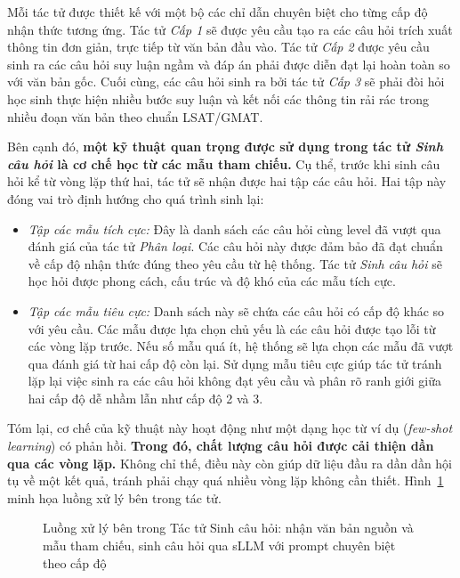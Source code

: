 Mỗi tác tử được thiết kế với một bộ các chỉ dẫn chuyên biệt cho từng cấp độ nhận thức tương ứng. Tác tử \textit{Cấp 1} sẽ được yêu cầu tạo ra các câu hỏi trích xuất thông tin đơn giản, trực tiếp từ văn bản đầu vào. Tác tử \textit{Cấp 2} được yêu cầu sinh ra các câu hỏi suy luận ngầm và đáp án phải được diễn đạt lại hoàn toàn so với văn bản gốc. Cuối cùng, các câu hỏi sinh ra bởi tác tử \textit{Cấp 3} sẽ phải đòi hỏi học sinh thực hiện nhiều bước suy luận và kết nối các thông tin rải rác trong nhiều đoạn văn bản theo chuẩn LSAT/GMAT.

Bên cạnh đó, \textbf{một kỹ thuật quan trọng được sử dụng trong tác tử \textit{Sinh câu hỏi} là cơ chế học từ các mẫu tham chiếu.} Cụ thể, trước khi sinh câu hỏi kể từ vòng lặp thứ hai, tác tử sẽ nhận được hai tập các câu hỏi. Hai tập này đóng vai trò định hướng cho quá trình sinh lại:
\begin{itemize}
    \item \textit{Tập các mẫu tích cực:} Đây là danh sách các câu hỏi cùng level đã vượt qua đánh giá của tác tử \textit{Phân loại}. Các câu hỏi này được đảm bảo đã đạt chuẩn về cấp độ nhận thức đúng theo yêu cầu từ hệ thống. Tác tử \textit{Sinh câu hỏi} sẽ học hỏi được phong cách, cấu trúc và độ khó của các mẫu tích cực.

    \item \textit{Tập các mẫu tiêu cực:} Danh sách này sẽ chứa các câu hỏi có cấp độ khác so với yêu cầu. Các mẫu được lựa chọn chủ yếu là các câu hỏi được tạo lỗi từ các vòng lặp trước. Nếu số mẫu quá ít, hệ thống sẽ lựa chọn các mẫu đã vượt qua đánh giá từ hai cấp độ còn lại. Sử dụng mẫu tiêu cực giúp tác tử tránh lặp lại việc sinh ra các câu hỏi không đạt yêu cầu và phân rõ ranh giới giữa hai cấp độ dễ nhầm lẫn như cấp độ 2 và 3.
\end{itemize}

Tóm lại, cơ chế của kỹ thuật này hoạt động như một dạng học từ ví dụ (\textit{few-shot learning}) có phản hồi. \textbf{Trong đó, chất lượng câu hỏi được cải thiện dần qua các vòng lặp.} Không chỉ thế, điều này còn giúp dữ liệu đầu ra dần dần hội tụ về một kết quả, tránh phải chạy quá nhiều vòng lặp không cần thiết. Hình~\ref{fig:agent-generator} minh họa luồng xử lý bên trong tác tử.

\begin{figure}[htbp]
    \centering
    \resizebox{0.85\textwidth}{!}{}
    \caption{Luồng xử lý bên trong Tác tử Sinh câu hỏi: nhận văn bản nguồn và mẫu tham chiếu, sinh câu hỏi qua sLLM với prompt chuyên biệt theo cấp độ}
    \label{fig:agent-generator}
\end{figure}

